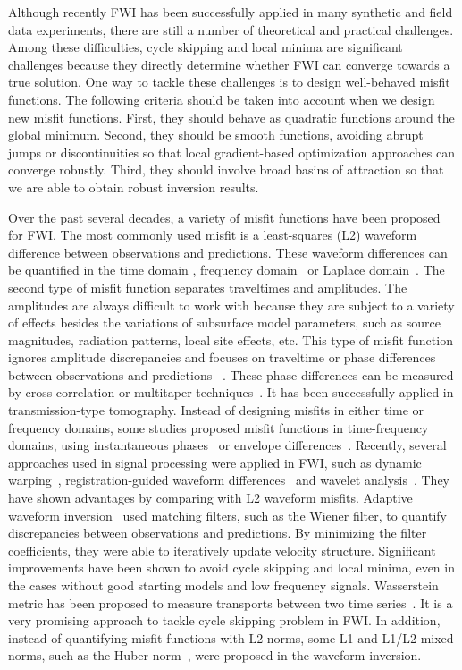 Although recently FWI has been successfully applied in many synthetic and field data 
experiments, there are still a number of theoretical and practical 
challenges. Among these difficulties, cycle skipping and local minima are 
significant challenges because they directly determine whether FWI can converge 
towards a true solution. One way to tackle these challenges is to design 
well-behaved misfit functions. The following criteria should be taken into account 
when we design new misfit functions. First, they should behave as quadratic functions
around the global minimum. Second, they should be smooth functions, 
avoiding abrupt jumps or discontinuities so that local gradient-based optimization 
approaches can converge robustly. Third, they should involve broad basins of attraction 
so that we are able to obtain robust inversion results. 

Over the past several decades, a variety of misfit functions have been proposed for FWI. 
The most commonly used misfit is a least-squares (L2) waveform difference between 
observations and predictions. These waveform differences can be quantified in the time domain
\citep{Tarantola1984}, frequency domain~\citep{Pratt1999} or Laplace domain~\citep{Shin2008}. 
The second type of misfit function separates traveltimes and amplitudes. 
The amplitudes are always difficult to work with because they are subject to a variety 
of effects besides the variations of subsurface model parameters, 
such as source magnitudes, radiation patterns, local site effects, etc. 
This type of misfit function ignores amplitude discrepancies 
and focuses on traveltime or phase differences between observations and predictions 
~\citep{Luo1991, Leeuwen2010}. These phase differences can be measured by cross correlation or
multitaper techniques~\citep{ZhouY2004, Zhuetal2015_gji}. It has been successfully 
applied in transmission-type tomography. Instead of designing misfits in either time 
or frequency domains, some studies proposed misfit functions in time-frequency 
domains, using instantaneous phases~\citep{Fichtner2008} or envelope differences~\citep{Wu2014}.  
Recently, several approaches used in signal processing were applied 
in FWI, such as dynamic warping~\citep{dynamicwarping}, registration-guided 
waveform differences~\citep{Baek2013} and wavelet analysis~\citep{Yuan2014}. They have shown advantages by comparing with 
L2 waveform misfits. Adaptive waveform inversion~\citep{Warner2014} used matching filters, 
such as the Wiener filter, to quantify discrepancies between observations and predictions. 
By minimizing the filter coefficients, they were able to iteratively update 
velocity structure. Significant improvements have been shown to avoid cycle skipping and 
local minima, even in the cases without good starting models and low frequency signals. 
Wasserstein metric has been proposed to measure transports between two 
time series~\citep{Engquist2014}. 
It is a very promising approach to tackle cycle skipping problem in FWI. In addition, 
instead of quantifying misfit functions with L2 norms, some L1 and L1/L2 mixed norms, 
such as the Huber norm~\citep{huber2009}, were proposed in the waveform inversion. 
 
